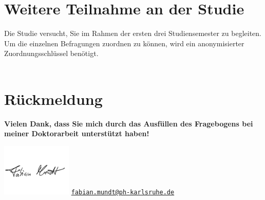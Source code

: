 
\vspace{-.25cm}
\section{Weitere Teilnahme an der Studie}
\vspace{.25cm}

\begin{choicequestion}[4]{Die Studie versucht, Sie im Rahmen der ersten drei Studiensemester zu begleiten. Um die einzelnen Befragungen zuordnen zu können, wird ein anonymisierter Zuordnungsschlüssel benötigt.}
	\\
	\\
\end{choicequestion}

\separate

\vspace{.25cm}
\section{Rückmeldung}
\vspace{.25cm}



\separate

\textbf{Vielen Dank, dass Sie mich durch das Ausfüllen des Fragebogens bei meiner Doktorarbeit unterstützt haben!}

\vspace{-1.5cm}
\flushright
\includegraphics[width=0.25\textwidth]{unterschrift.png}
\vspace{-1.5cm}
\flushright
\href{mailto:fabian.mundt@ph-karlsruhe.de}{\nolinkurl{fabian.mundt@ph-karlsruhe.de}}
